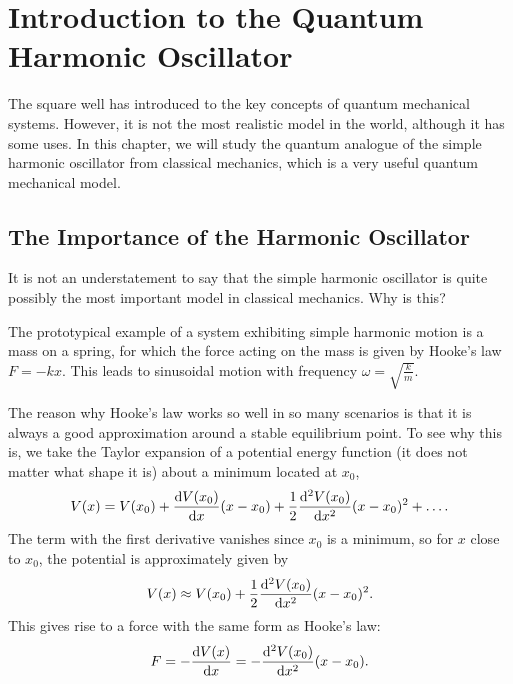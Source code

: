 \documentclass[../quantum_mechanics.tex]{subfiles}
\begin{document}
    \section{Introduction to the Quantum Harmonic Oscillator}\label{sec:introduction-to-the-quantum-harmonic-oscillator}
        The square well has introduced to the key concepts of quantum mechanical systems.
        However, it is not the most realistic model in the world, although it has some uses.
        In this chapter, we will study the quantum analogue of the simple harmonic oscillator from classical mechanics, which is a very useful quantum mechanical model.

        \subsection{The Importance of the Harmonic Oscillator}\label{subsec:importance-of-the-harmonic-oscillator}
            It is not an understatement to say that the simple harmonic oscillator is quite possibly the most important model in classical mechanics.
            Why is this?

            The prototypical example of a system exhibiting simple harmonic motion is a mass on a spring, for which the force acting on the mass is given by Hooke's law $F=-kx$.
            This leads to sinusoidal motion with frequency $\omega=\sqrt{\frac{k}{m}}$.

            The reason why Hooke's law works so well in so many scenarios is that it is always a good approximation around a stable equilibrium point.
            To see why this is, we take the Taylor expansion of a potential energy function (it does not matter what shape it is) about a minimum located at $x_0$,
            \begin{equation}
                V(x)=V(x_0)+\dv{V(x_0)}{x}(x-x_0)+\frac{1}{2}\dv[2]{V(x_0)}{x}(x-x_0)^2+\dots.
            \end{equation}
            The term with the first derivative vanishes since $x_0$ is a minimum, so for $x$ close to $x_0$, the potential is approximately given by
            \begin{equation}
                V(x)\approx V(x_0)+\frac{1}{2}\dv[2]{V(x_0)}{x}(x-x_0)^2.
            \end{equation}
            This gives rise to a force with the same form as Hooke's law:
            \begin{equation}
                F=-\dv{V(x)}{x}=-\dv[2]{V(x_0)}{x}(x-x_0).
            \end{equation}
\end{document}
